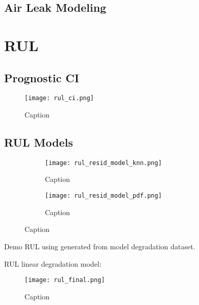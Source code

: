 \subsection{Air Leak Modeling}


\section{RUL}
\subsection{Prognostic CI}
\begin{figure}[h!]
    \centering
    \texttt{[image: rul\_ci.png]}
    \caption{Caption}
    \label{fig:}
\end{figure}


\subsection{RUL Models}

\begin{figure}
    \centering
    \begin{subfigure}[b]{0.55\textwidth}
        \centering
        \texttt{[image: rul\_resid\_model\_knn.png]}
        \caption{Caption}
        \label{fig:}
    \end{subfigure}
    \hfill
    \begin{subfigure}[b]{0.4\textwidth}
        \centering
        \texttt{[image: rul\_resid\_model\_pdf.png]}
        \caption{Caption}
        \label{fig:}
    \end{subfigure}
    \caption{Caption}
    \label{fig:}
\end{figure}


Demo RUL using generated from model degradation dataset.

RUL linear degradation model:
\begin{figure}[h!]
    \centering
    \texttt{[image: rul\_final.png]}
    \caption{Caption}
    \label{fig:}
\end{figure}


\lipsum
